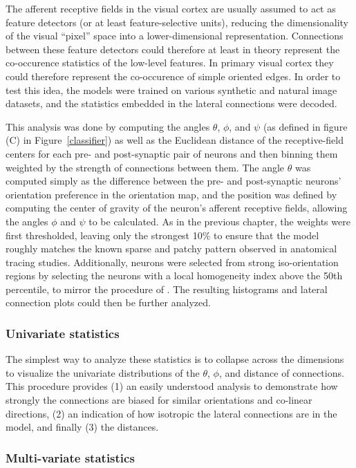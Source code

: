 The afferent receptive fields in the visual cortex are usually assumed
to act as feature detectors (or at least feature-selective units),
reducing the dimensionality of the visual 
``pixel'' space into a lower-dimensional representation. Connections
between these feature detectors could therefore at least in theory
represent the co-occurence statistics of the low-level features. In
primary visual cortex they could therefore represent the co-occurence
of simple oriented edges. In order to test this idea, the models
were trained on various synthetic and natural image datasets, and the
statistics embedded in the lateral connections were decoded.

This analysis was done by computing the angles $\theta$, $\phi$, and $\psi$ (as
defined in figure (C) in Figure~\ref{classifier}) as well as the
Euclidean distance of the receptive-field centers for each pre- and
post-synaptic pair of neurons and then binning them weighted by the
strength of connections between them. The angle $\theta$ was computed
simply as the difference between the pre- and post-synaptic neurons'
orientation preference in the orientation map, and the position was
defined by computing the center of gravity of the neuron's afferent receptive
fields, allowing the angles $\phi$ and $\psi$ to be calculated. As in
the previous chapter, the weights were first thresholded, leaving only the
strongest 10\% to ensure that the model roughly matches the known
sparse and patchy pattern observed in anatomical tracing
studies. Additionally, neurons were selected from strong
iso-orientation regions by selecting the neurons with a local
homogeneity index above the 50th percentile, to mirror the procedure
of \cite{Bosking1997}. The resulting histograms and lateral connection
plots could then be further analyzed.

\subsubsection*{Univariate statistics}

The simplest way to analyze these statistics is to collapse across
the dimensions to visualize the univariate distributions of the
$\theta$, $\phi$, and distance of connections. This procedure provides
(1) an easily understood analysis to demonstrate how strongly the
connections are biased for similar orientations and co-linear
directions, (2) an indication of how isotropic the lateral connections
are in the model, and finally (3) the distances.

\subsubsection*{Multi-variate statistics}

